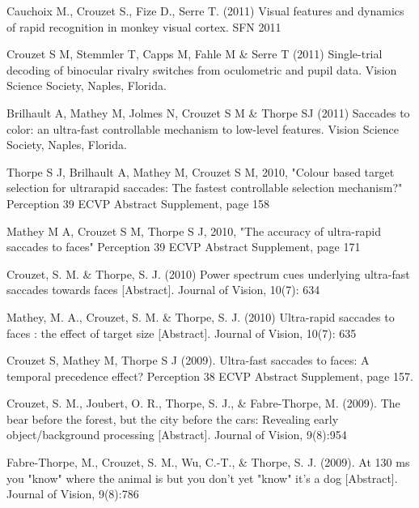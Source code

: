 \documentclass[margin,line]{resume}
\begin{document}
\begin{resume}
\newpage

	\vspace{-2mm} Cauchoix M., Crouzet S., Fize D., Serre T. (2011) Visual features and dynamics of rapid recognition in monkey visual cortex. SFN 2011

	\vspace{-2mm} Crouzet S M, Stemmler T, Capps M, Fahle M \& Serre T (2011) Single-trial decoding of binocular rivalry switches from oculometric and pupil data. Vision Science Society, Naples, Florida.

	\vspace{-2mm} Brilhault A, Mathey M, Jolmes N, Crouzet S M \& Thorpe SJ (2011) Saccades to color: an ultra-fast controllable mechanism to low-level features. Vision Science Society, Naples, Florida.

	\vspace{-2mm} Thorpe S J, Brilhault A, Mathey M, Crouzet S M, 2010, "Colour based target selection for ultrarapid saccades: The fastest controllable selection mechanism?" Perception 39 ECVP Abstract Supplement, page 158

	\vspace{-2mm} Mathey M A, Crouzet S M, Thorpe S J, 2010, "The accuracy of ultra-rapid saccades to faces" Perception 39 ECVP Abstract Supplement, page 171

	\vspace{-2mm} Crouzet, S. M. \& Thorpe, S. J. (2010) Power spectrum cues underlying ultra-fast saccades towards faces [Abstract]. Journal of Vision, 10(7): 634

	\vspace{-2mm} Mathey, M. A., Crouzet, S. M. \& Thorpe, S. J. (2010) Ultra-rapid saccades to faces : the effect of target size [Abstract]. Journal of Vision, 10(7): 635

	\vspace{-2mm} Crouzet S, Mathey M, Thorpe S J (2009). Ultra-fast saccades to faces: A temporal precedence effect? Perception 38 ECVP Abstract Supplement, page 157.

	\vspace{-2mm} Crouzet, S. M., Joubert, O. R., Thorpe, S. J., \& Fabre-Thorpe, M. (2009). The bear before the forest, but the city before the cars: Revealing early object/background processing [Abstract]. Journal of Vision, 9(8):954

	\vspace{-2mm} Fabre-Thorpe, M., Crouzet, S. M., Wu, C.-T., \& Thorpe, S. J. (2009). At 130 ms you "know" where the animal is but you don't yet "know" it's a dog [Abstract]. Journal of Vision, 9(8):786


\end{resume}
\end{document}
